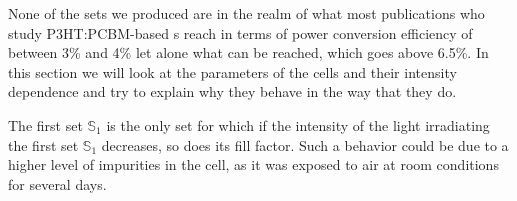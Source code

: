\documentclass[a4paper,10pt,twocolumn]{article}
\begin{document}
\begin{extract*}

%
%
None of the sets we produced are in the realm of what most publications who study P3HT:PCBM-based \BHSC s reach in terms of power conversion efficiency of between 3\% and 4\% let alone what can be reached, which goes above 6.5\%\cite{source13}. In this section we will look at the parameters of the cells and their intensity dependence and try to explain why they behave in the way that they do.\mypar

The first set $\mathbb{S}_1$ is the only set for which if the intensity of the light irradiating the first set $\mathbb{S}_1$ decreases, so does its fill factor. Such a behavior could be due to a higher level of impurities in the cell, as it was exposed to air at room conditions for several days.


\end{extract*}
\end{document}
